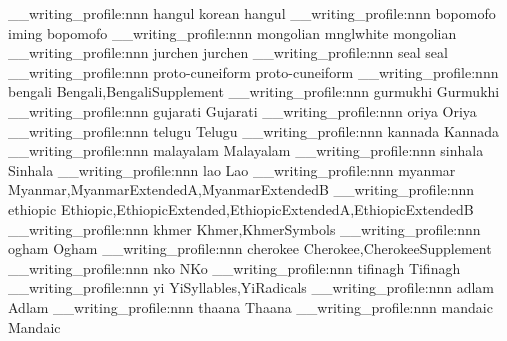 \__writing_profile:nnn {hangul} {korean} {hangul}
\__writing_profile:nnn {bopomofo} {iming} {bopomofo}
\__writing_profile:nnn {mongolian} {mnglwhite} {mongolian}
\__writing_profile:nnn {jurchen} {} {jurchen}
\__writing_profile:nnn {seal} {} {seal}
\__writing_profile:nnn {proto-cuneiform} {} {proto-cuneiform}
\__writing_profile:nnn {bengali} {} {Bengali,BengaliSupplement}
\__writing_profile:nnn {gurmukhi} {} {Gurmukhi}
\__writing_profile:nnn {gujarati} {} {Gujarati}
\__writing_profile:nnn {oriya} {} {Oriya}
\__writing_profile:nnn {telugu} {} {Telugu}
\__writing_profile:nnn {kannada} {} {Kannada}
\__writing_profile:nnn {malayalam} {} {Malayalam}
\__writing_profile:nnn {sinhala} {} {Sinhala}
\__writing_profile:nnn {lao} {} {Lao}
\__writing_profile:nnn {myanmar} {} {Myanmar,MyanmarExtendedA,MyanmarExtendedB}
\__writing_profile:nnn {ethiopic} {} {Ethiopic,EthiopicExtended,EthiopicExtendedA,EthiopicExtendedB}
\__writing_profile:nnn {khmer} {} {Khmer,KhmerSymbols}
\__writing_profile:nnn {ogham} {} {Ogham}
\__writing_profile:nnn {cherokee} {} {Cherokee,CherokeeSupplement}
\__writing_profile:nnn {nko} {} {NKo}
\__writing_profile:nnn {tifinagh} {} {Tifinagh}
\__writing_profile:nnn {yi} {} {YiSyllables,YiRadicals}
\__writing_profile:nnn {adlam} {} {Adlam}
\__writing_profile:nnn {thaana} {} {Thaana}
\__writing_profile:nnn {mandaic} {} {Mandaic}

